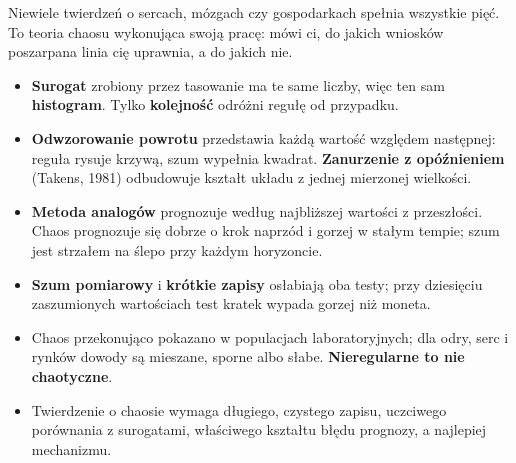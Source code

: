 \noindent
Niewiele twierdzeń o sercach, mózgach czy gospodarkach spełnia wszystkie
pięć. To teoria chaosu wykonująca swoją pracę: mówi ci, do jakich wniosków
poszarpana linia cię uprawnia, a do jakich nie.


\begin{summarybox}
\begin{itemize}
\item \textbf{Surogat} zrobiony przez tasowanie ma te same liczby, więc ten
  sam \textbf{histogram}. Tylko \textbf{kolejność} odróżni regułę od
  przypadku.
\item \textbf{Odwzorowanie powrotu} przedstawia każdą wartość względem
  następnej: reguła rysuje krzywą, szum wypełnia kwadrat. \textbf{Zanurzenie
  z opóźnieniem} (Takens, 1981) odbudowuje kształt układu z jednej mierzonej
  wielkości.
\item \textbf{Metoda analogów} prognozuje według najbliższej wartości z
  przeszłości. Chaos prognozuje się dobrze o krok naprzód i gorzej w stałym
  tempie; szum jest strzałem na ślepo przy każdym horyzoncie.
\item \textbf{Szum pomiarowy} i \textbf{krótkie zapisy} osłabiają oba testy;
  przy dziesięciu zaszumionych wartościach test kratek wypada gorzej niż
  moneta.
\item Chaos przekonująco pokazano w populacjach laboratoryjnych; dla odry,
  serc i rynków dowody są mieszane, sporne albo słabe. \textbf{Nieregularne to
  nie chaotyczne}.
\item Twierdzenie o chaosie wymaga długiego, czystego zapisu, uczciwego
  porównania z surogatami, właściwego kształtu błędu prognozy, a najlepiej
  mechanizmu.
\end{itemize}
\end{summarybox}

\canyou

